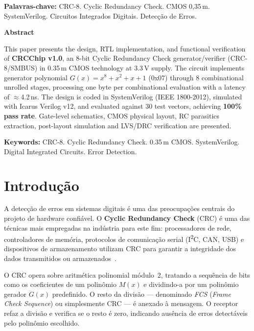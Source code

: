 \documentclass[12pt,a4paper]{article}
\newenvironment{abstractenv}{%
  \begin{center}\textbf{Abstract}\end{center}\small\setlength{\parindent}{0pt}}{}
\begin{document}
\vspace{1.0cm}
\noindent\textbf{Palavras-chave:} CRC-8. Cyclic Redundancy Check. CMOS 0,35\,\textmu m. SystemVerilog. Circuitos Integrados Digitais. Detecção de Erros.

\vspace{1.2cm}
\begin{abstractenv}
This paper presents the design, RTL implementation, and functional verification of \textbf{CRCChip v1.0}, an 8-bit Cyclic Redundancy Check generator/verifier (CRC-8/SMBUS) in 0.35\,\textmu m CMOS technology at 3.3\,V supply. The circuit implements generator polynomial $G(x)=x^8+x^2+x+1$ (0x07) through 8 combinational unrolled stages, processing one byte per combinational evaluation with a latency of $\approx$4.2\,ns. The design is coded in SystemVerilog (IEEE 1800-2012), simulated with Icarus Verilog v12, and evaluated against 30 test vectors, achieving \textbf{100\% pass rate}. Gate-level schematics, CMOS physical layout, RC parasitics extraction, post-layout simulation and LVS/DRC verification are presented.
\end{abstractenv}

\vspace{0.5cm}
\noindent\textbf{Keywords:} CRC-8. Cyclic Redundancy Check. 0.35\,\textmu m CMOS. SystemVerilog. Digital Integrated Circuits. Error Detection.
\newpage

\tableofcontents\newpage
\listoffigures\newpage
\listoftables\newpage

\section{Introdução}

A detecção de erros em sistemas digitais é uma das preocupações centrais do projeto de hardware confiável. O \textbf{Cyclic Redundancy Check} (CRC) é uma das técnicas mais empregadas na indústria para este fim: processadores de rede, controladores de memória, protocolos de comunicação serial (I\textsuperscript{2}C, CAN, USB) e dispositivos de armazenamento utilizam CRC para garantir a integridade dos dados transmitidos ou armazenados~\cite{crc_koopman}.

O CRC opera sobre aritmética polinomial módulo~2, tratando a sequência de bits como os coeficientes de um polinômio $M(x)$ e dividindo-a por um polinômio gerador $G(x)$ predefinido. O resto da divisão — denominado \textit{FCS} (\textit{Frame Check Sequence}) ou simplesmente CRC — é anexado à mensagem. O receptor refaz a divisão e verifica se o resto é zero, indicando ausência de erros detectáveis pelo polinômio escolhido.
\end{document}
